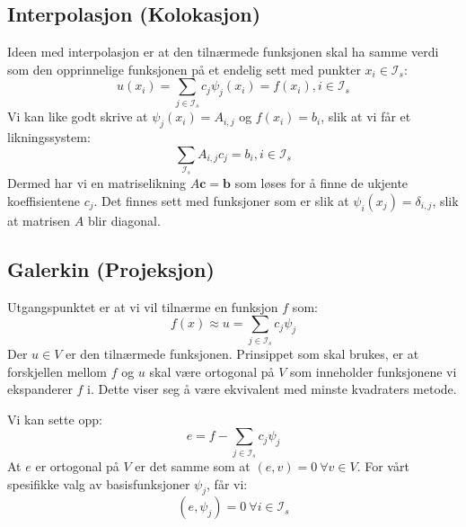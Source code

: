 \documentclass[a4paper, 10pt]{article}
\newcommand{\mb}{\mathbf}
\newcommand{\mc}{\mathcal}
\begin{document}
\subsection{Interpolasjon (Kolokasjon)}
Ideen med interpolasjon er at den tilnærmede funksjonen skal ha samme verdi som den opprinnelige funksjonen på et endelig sett med punkter $x_i \in \mc{I}_s$:
\begin{equation}
	u(x_i) = \sum_{j\in \mc{I}_s}c_j \psi_j(x_i) = f(x_i), i\in \mc{I}_s
\end{equation}
Vi kan like godt skrive at $\psi_j(x_i) = A_{i,j}$ og $f(x_i) = b_i$, slik at vi får et likningssystem:
\begin{equation}
	\sum_{\mc{I}_s} A_{i,j}c_j = b_i, i\in \mc{I}_s
\end{equation}
Dermed har vi en matriselikning $A\mb{c} = \mb{b}$ som løses for å finne de ukjente koeffisientene $c_j$.
Det finnes sett med funksjoner som er slik at $\psi_i(x_j) = \delta_{i,j}$, slik at matrisen $A$ blir diagonal. 

\subsection{Galerkin (Projeksjon)}
Utgangspunktet er at vi vil tilnærme en funksjon $f$ som:
\begin{equation}
	f(x) \approx u = \sum_{j\in \mc{I}_s} c_j \psi_j
\end{equation}
Der $u \in V$ er den tilnærmede funksjonen.
Prinsippet som skal brukes, er at forskjellen mellom $f$ og $u$ skal være ortogonal på $V$ som inneholder funksjonene vi ekspanderer $f$ i. Dette viser seg å være ekvivalent med minste kvadraters metode. 

Vi kan sette opp: 
\begin{equation}
	e = f - \sum_{j\in \mc{I}_s} c_j \psi_j
\end{equation}
At $e$ er ortogonal på $V$ er det samme som at $(e, v) = 0 \  \forall v \in V$. For vårt spesifikke valg av basisfunksjoner $\psi_j$, får vi:
\begin{equation}
	(e, \psi_j) = 0 \ \forall i \in \mc{I}_s
\end{equation}


\section{}
\end{document}
